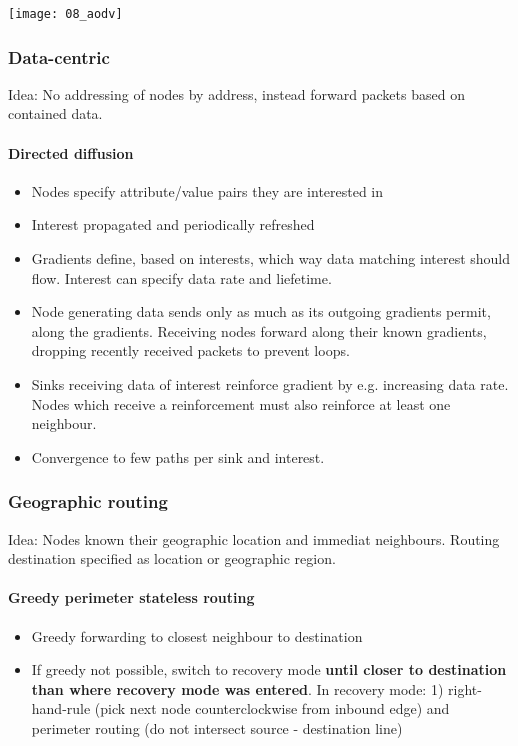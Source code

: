 \texttt{[image: 08\_aodv]}

\subsubsection{Data-centric}

Idea: No addressing of nodes by address, instead forward packets based on
contained data.

\paragraph{Directed diffusion}

\begin{itemize}
		\item Nodes specify attribute/value pairs they are interested in
		\item Interest propagated and periodically refreshed
		\item Gradients define, based on interests, which way data matching
				interest should flow. Interest can specify data rate and
				liefetime.
		\item Node generating data sends only as much as its outgoing gradients
				permit, along the gradients. Receiving nodes forward along
				their known gradients, dropping recently received packets to
				prevent loops.
		\item Sinks receiving data of interest reinforce gradient by e.g.
				increasing data rate. Nodes which receive a reinforcement must
				also reinforce at least one neighbour.
		\item Convergence to few paths per sink and interest.
\end{itemize}

\subsubsection{Geographic routing}

Idea: Nodes known their geographic location and immediat neighbours. Routing
destination specified as location or geographic region.

\paragraph{Greedy perimeter stateless routing}

\begin{itemize}
		\item Greedy forwarding to closest neighbour to destination
		\item If greedy not possible, switch to recovery mode \textbf{until
				closer to destination than where recovery mode was entered}. In
				recovery mode: 1) right-hand-rule (pick next node
				counterclockwise from inbound edge) and perimeter routing (do
				not intersect source - destination line)
\end{itemize}


